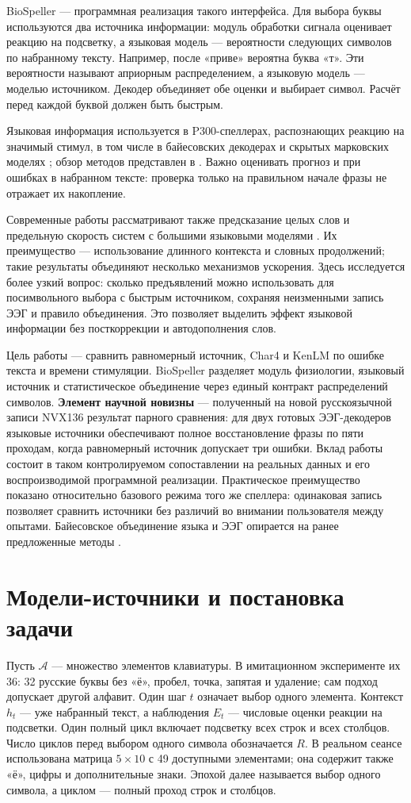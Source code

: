 \documentclass[11pt,a4paper]{article}
\begin{document}
BioSpeller --- программная реализация такого интерфейса. Для выбора буквы используются два источника информации: модуль обработки сигнала оценивает реакцию на подсветку, а языковая модель --- вероятности следующих символов по набранному тексту. Например, после «приве» вероятна буква «т». Эти вероятности называют априорным распределением, а языковую модель --- моделью источником. Декодер объединяет обе оценки и выбирает символ. Расчёт перед каждой буквой должен быть быстрым.

Языковая информация используется в P300-спеллерах, распознающих реакцию на значимый стимул, в том числе в байесовских декодерах и скрытых марковских моделях \citep{p22156110,p24760927}; обзор методов представлен в \citep{p27153565}. Важно оценивать прогноз и при ошибках в набранном тексте: проверка только на правильном начале фразы не отражает их накопление.

Современные работы рассматривают также предсказание целых слов и предельную скорость систем с большими языковыми моделями \citep{p42821610}. Их преимущество --- использование длинного контекста и словных продолжений; такие результаты объединяют несколько механизмов ускорения. Здесь исследуется более узкий вопрос: сколько предъявлений можно использовать для посимвольного выбора с быстрым источником, сохраняя неизменными запись ЭЭГ и правило объединения. Это позволяет выделить эффект языковой информации без посткоррекции и автодополнения слов.

Цель работы --- сравнить равномерный источник, Char4 и KenLM по ошибке текста и времени стимуляции. BioSpeller разделяет модуль физиологии, языковый источник и статистическое объединение через единый контракт распределений символов. \textbf{Элемент научной новизны} --- полученный на новой русскоязычной записи NVX136 результат парного сравнения: для двух готовых ЭЭГ-декодеров языковые источники обеспечивают полное восстановление фразы по пяти проходам, когда равномерный источник допускает три ошибки. Вклад работы состоит в таком контролируемом сопоставлении на реальных данных и его воспроизводимой программной реализации. Практическое преимущество показано относительно базового режима того же спеллера: одинаковая запись позволяет сравнить источники без различий во внимании пользователя между опытами. Байесовское объединение языка и ЭЭГ опирается на ранее предложенные методы \citep{p22156110,p24760927}.

\section{Модели-источники и постановка задачи}
Пусть $\mathcal A$ --- множество элементов клавиатуры. В имитационном эксперименте их 36: 32 русские буквы без «ё», пробел, точка, запятая и удаление; сам подход допускает другой алфавит. Один шаг $t$ означает выбор одного элемента. Контекст $h_t$ --- уже набранный текст, а наблюдения $E_t$ --- числовые оценки реакции на подсветки. Один полный цикл включает подсветку всех строк и всех столбцов. Число циклов перед выбором одного символа обозначается $R$. В реальном сеансе использована матрица $5\times10$ с 49 доступными элементами; она содержит также «ё», цифры и дополнительные знаки. Эпохой далее называется выбор одного символа, а циклом --- полный проход строк и столбцов.
\end{document}
